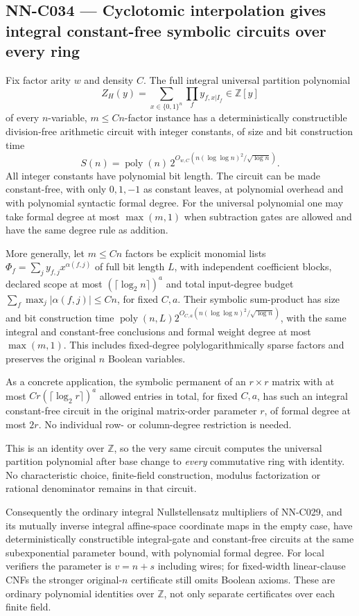 \subsection{NN-C034 --- Cyclotomic interpolation gives integral constant-free symbolic circuits over every ring}
\begin{proposition}[NN-C034]
Fix factor arity $w$ and density $C$. The full integral universal partition polynomial
\[
 Z_H(y)=\sum_{x\in\{0,1\}^n}\prod_f y_{f,x|I_f}
                              \in\mathbb Z[y]
\]
of every $n$-variable, $m\leq Cn$-factor instance has a deterministically constructible division-free arithmetic circuit with integer constants, of size and bit construction time
\[
 S(n)=\operatorname{poly}(n)\,
       2^{O_{w,C}(n(\log\log n)^2/\sqrt{\log n})}.
\]
All integer constants have polynomial bit length. The circuit can be made constant-free, with only $0,1,-1$ as constant leaves, at polynomial overhead and with polynomial syntactic formal degree. For the universal polynomial one may take formal degree at most $\max(m,1)$ when subtraction gates are allowed and have the same degree rule as addition.

More generally, let $m\leq Cn$ factors be explicit monomial lists $\Phi_f=\sum_j y_{f,j}x^{\alpha(f,j)}$ of full bit length $L$, with independent coefficient blocks, declared scope at most $(\lceil\log_2n\rceil)^a$ and total input-degree budget $\sum_f\max_j|\alpha(f,j)|\leq Cn$, for fixed $C,a$. Their symbolic sum-product has size and bit construction time $\operatorname{poly}(n,L)2^{O_{C,a}(n(\log\log n)^2/\sqrt{\log n})}$, with the same integral and constant-free conclusions and formal weight degree at most $\max(m,1)$. This includes fixed-degree polylogarithmically sparse factors and preserves the original $n$ Boolean variables.

As a concrete application, the symbolic permanent of an $r\times r$ matrix with at most $Cr(\lceil\log_2r\rceil)^a$ allowed entries in total, for fixed $C,a$, has such an integral constant-free circuit in the original matrix-order parameter $r$, of formal degree at most $2r$. No individual row- or column-degree restriction is needed.

This is an identity over $\mathbb Z$, so the very same circuit computes the universal partition polynomial after base change to \emph{every} commutative ring with identity. No characteristic choice, finite-field construction, modulus factorization or rational denominator remains in that circuit.

Consequently the ordinary integral Nullstellensatz multipliers of NN-C029, and its mutually inverse integral affine-space coordinate maps in the empty case, have deterministically constructible integral-gate and constant-free circuits at the same subexponential parameter bound, with polynomial formal degree. For local verifiers the parameter is $v=n+s$ including wires; for fixed-width linear-clause CNFs the stronger original-$n$ certificate still omits Boolean axioms. These are ordinary polynomial identities over $\mathbb Z$, not only separate certificates over each finite field.


\end{proposition}
